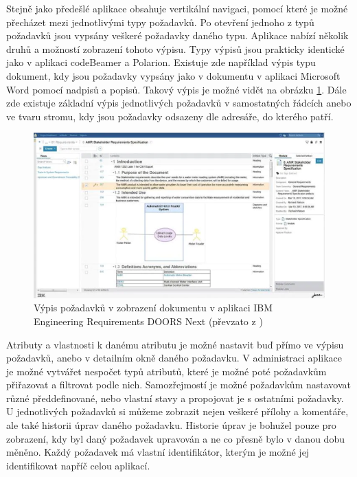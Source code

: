 \documentclass[czech,master]{diploma}
\begin{document}
Stejně jako předešlé aplikace obsahuje vertikální navigaci, pomocí které je možné přecházet mezi jednotlivými typy požadavků. Po otevření jednoho z typů požadavků jsou vypsány veškeré požadavky daného typu. Aplikace nabízí několik druhů a možností zobrazení tohoto výpisu. Typy výpisů jsou prakticky identické jako v aplikaci codeBeamer a Polarion. Existuje zde například výpis typu dokument, kdy jsou požadavky vypsány jako v dokumentu v aplikaci Microsoft Word pomocí nadpisů a popisů. Takový výpis je možné vidět na obrázku \ref{fig:ibm_doors_req}. Dále zde existuje základní výpis jednotlivých požadavků v samostatných řádcích anebo ve tvaru stromu, kdy jsou požadavky odsazeny dle adresáře, do kterého patří.

\begin{figure}[!ht]
    \centering
    \includegraphics[width=1\textwidth]{Diplomka/Figures/ibm_doors_ng_req.png}
    \caption{Výpis požadavků v zobrazení dokumentu v aplikaci IBM Engineering Requirements DOORS Next (převzato z \cite{ref:ibm_jazz_erm_dn})}
    \label{fig:ibm_doors_req}
\end{figure}
Atributy a vlastnosti k danému atributu je možné nastavit buď přímo ve výpisu požadavků, anebo v detailním okně daného požadavku. V administraci aplikace je možné vytvářet nespočet typů atributů, které je možné poté požadavkům přiřazovat a filtrovat podle nich. Samozřejmostí je možné požadavkům nastavovat různé předdefinované, nebo vlastní stavy a propojovat je s ostatními požadavky. U jednotlivých požadavků si můžeme zobrazit nejen veškeré přílohy a komentáře, ale také historii úprav daného požadavku. Historie úprav je bohužel pouze pro zobrazení, kdy byl daný požadavek upravován a ne co přesně bylo v danou dobu měněno. Každý požadavek má vlastní identifikátor, kterým je možné jej identifikovat napříč celou aplikací.
\end{document}
